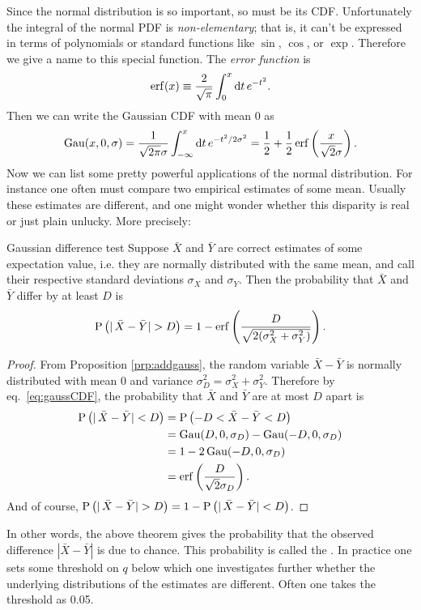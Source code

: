 Since the normal distribution is so important, so must be its CDF.
Unfortunately the integral of the normal PDF is {\it non-elementary};
 that is, it can't be expressed in terms of 
polynomials or standard
functions like $\sin$, $\cos$, or $\exp$. Therefore we give a name
to this special function.
The {\it error function} is
\begin{equation}
  \erf(x)\equiv\frac{2}{\sqrt{\pi}}\int_0^x\dd{t}e^{-t^2}.
\end{equation}
Then we can write the Gaussian CDF with mean 0 as
\begin{equation}
  \label{eq:gaussCDF}
  \Gau(x,0,\sigma)=\frac{1}{\sqrt{2\pi}\sigma}
                   \int_{-\infty}^x\dd{t}e^{-t^2/2\sigma^2}
                  =\frac{1}{2}+\frac{1}{2}
                   \erf\left(\frac{x}{\sqrt{2}\sigma}\right).
\end{equation}
Now we can list some pretty powerful applications of the normal distribution.
For instance one often must compare two empirical estimates of some mean.
Usually these estimates are different, and one might wonder whether this
disparity is real or just plain unlucky. More precisely:
\begin{theorem}{Gaussian difference test}{}
  Suppose $\bar{X}$ and $\bar{Y}$ are correct estimates of 
  some expectation
  value, i.e. they are normally distributed with the same mean, and call
  their respective standard deviations $\sigma_X$ and
  $\sigma_Y$. Then the probability that $\bar{X}$ 
  and $\bar{Y}$ differ by at least $D$ is
  \begin{equation*}
    \pr{|\,\bar{X}-\bar{Y}|>D}=1-\erf\left(\frac{D}
       {\sqrt{2(\sigma_X^2+\sigma_Y^2)}}\right).
  \end{equation*}
  \begin{proof}
    From Proposition \ref{prp:addgauss}, the random variable
    $\bar{X}-\bar{Y}$ is normally distributed with mean 0 
    and variance $\sigma_D^2=\sigma_X^2+\sigma_Y^2$. Therefore by
    eq.~\eqref{eq:gaussCDF}, the probability that $\bar{X}$ and 
    $\bar{Y}$ are at most $D$ apart is
    \begin{equation*}
      \begin{aligned}
        \pr{|\,\bar{X}-\bar{Y}|<D}
            &=\pr{-D<\bar{X}-\bar{Y}<D}\\
            &=\Gau(D,0,\sigma_D)-\Gau(-D,0,\sigma_D)\\
            &=1-2\Gau(-D,0,\sigma_D)\\
            &=\erf\left(\frac{D}{\sqrt{2}\sigma_D}\right).
      \end{aligned}
    \end{equation*}
    And of course, $\pr{|\,\bar{X}-\bar{Y}|>D}
     =1-\pr{|\,\bar{X}-\bar{Y}|<D}$.
  \end{proof}
\end{theorem}
In other words, the above theorem gives the probability that the
observed difference $|\bar{X}-\bar{Y}|$ is due to chance. This probability
is called the . In practice one sets some 
threshold on $q$ below which one investigates further whether the 
underlying distributions of the estimates are different. Often one 
takes the threshold as 0.05.

